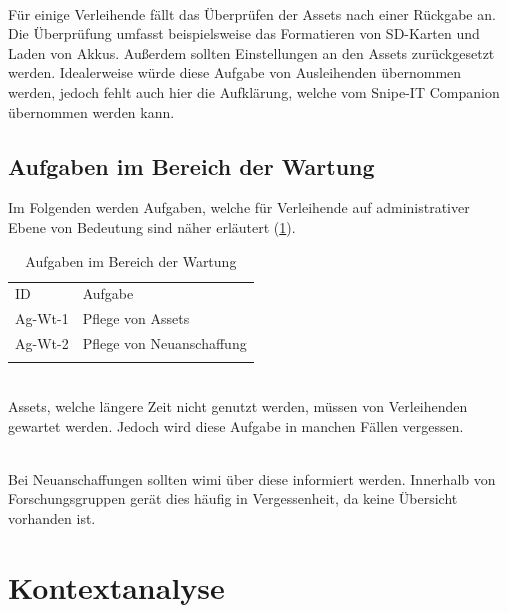 {\sffamily\color{maincolor}{Ag-Rg-2 | Überprüfung der Assets}}\\
Für einige Verleihende fällt das Überprüfen der Assets nach einer Rückgabe an.
Die Überprüfung umfasst beispielsweise das Formatieren von SD-Karten und Laden
von Akkus. Außerdem sollten Einstellungen an den Assets zurückgesetzt werden.
Idealerweise würde diese Aufgabe von Ausleihenden übernommen werden, jedoch
fehlt auch hier die Aufklärung, welche vom Snipe-IT Companion übernommen werden
kann.
\subsection{Aufgaben im Bereich der Wartung}
\label{subsec:wartung}
Im Folgenden werden Aufgaben, welche für Verleihende auf administrativer Ebene
von Bedeutung sind näher erläutert (\ref{table:Ag-Wt}).

\begin{table}[h]
        \centering
        \caption{Aufgaben im Bereich der Wartung}
        \begin{tabular}{ll}
                \arrayrulecolor{maincolor}\hline
                \sffamily\color{maincolor}ID & \sffamily\color{maincolor}Aufgabe
                \\
                \arrayrulecolor{maincolor}\hline
                Ag-Wt-1                      & Pflege von Assets
                \\
                Ag-Wt-2                      & Pflege von Neuanschaffung
                \\
                \arrayrulecolor{maincolor}\hline
        \end{tabular}
        \label{table:Ag-Wt}
\end{table}

{\sffamily\color{maincolor}{Ag-Wt-1 | Pflege von Assets}}\\
Assets, welche längere Zeit nicht genutzt werden, müssen von Verleihenden
gewartet werden. Jedoch wird diese Aufgabe in manchen Fällen vergessen.

        {\sffamily\color{maincolor}{Ag-Wt-2 | Pflege von Assets}} \\
Bei Neuanschaffungen sollten \ac{wimi} über diese informiert werden. Innerhalb
von Forschungsgruppen gerät dies häufig in Vergessenheit, da keine Übersicht
vorhanden ist.

\section{Kontextanalyse}
\label{section:kontext}

